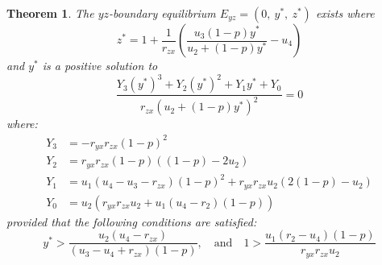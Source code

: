 \documentclass[]{interact}
\theoremstyle{plain}%
\newtheorem{theorem}{Theorem}[section]
\theoremstyle{definition}
\theoremstyle{remark}
\numberwithin{equation}{section}
\begin{document}
\begin{theorem}\label{thm:boundary-yz-exist}
    The $yz$-boundary equilibrium $E_{yz}=\left(0,\ y^*,\ z^*\right)$ exists where
    \begin{equation*}
        z^*=1+\frac{1}{r_{zx}}\left(\frac{u_3\left(1-p\right)y^*}{u_2+\left(1-p\right)y^*}-u_4\right)
    \end{equation*}
    and $y^*$ is a positive solution to 
    \begin{equation}\label{eq:yz-Y-vars}
        \frac{Y_3\left(y^*\right)^3+Y_2\left(y^*\right)^2+Y_1y^*+Y_0}{r_{zx}\left(u_2+\left(1-p\right)y^*\right)^2}=0
    \end{equation}
    where:
    \begin{align*}
        Y_3 &= -r_{yx}r_{zx}\left(1-p\right)^2\\
        Y_2 &= r_{yx}r_{zx}\left(1-p\right)\left(\left(1-p\right)-2u_2\right)\\
        Y_1 &= u_1\left(u_4-u_3-r_{zx}\right)\left(1-p\right)^2+r_{yx}r_{zx}u_2\left(2\left(1-p\right)-u_2\right)\\
        Y_0 &= u_2\left(r_{yx}r_{zx}u_2+u_1\left(u_4-r_2\right)\left(1-p\right)\right)
    \end{align*}
    provided that the following conditions are satisfied:
    \begin{equation*}
        y^* > \frac{u_2\left(u_4-r_{zx}\right)}{\left(u_3-u_4+r_{zx}\right)\left(1-p\right)},\quad \text{and} \quad 1 > \frac{u_1\left(r_2-u_4\right)\left(1-p\right)}{r_{yx}r_{zx}u_2}
    \end{equation*}
\end{theorem}
\end{document}
